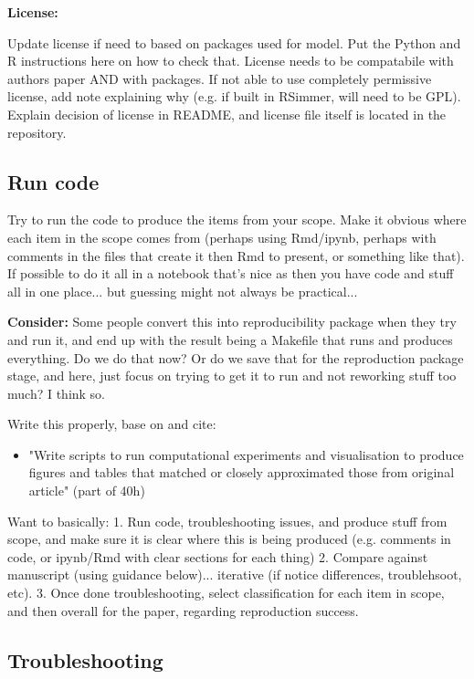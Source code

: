\textbf{License:}

Update license if need to based on packages used for model. Put the Python and R instructions here on how to check that. License needs to be compatabile with authors paper AND with packages. If not able to use completely permissive license, add note explaining why (e.g. if built in RSimmer, will need to be GPL). Explain decision of license in README, and license file itself is located in the repository.

\subsection{Run code}

Try to run the code to produce the items from your scope.
Make it obvious where each item in the scope comes from (perhaps using Rmd/ipynb, perhaps with comments in the files that create it then Rmd to present, or something like that). If possible to do it all in a notebook that's nice as then you have code and stuff all in one place... but guessing might not always be practical...

\textbf{Consider:} Some people convert this into reproducibility package when they try and run it, and end up with the result being a Makefile that runs and produces everything. Do we do that now? Or do we save that for the reproduction package stage, and here, just focus on trying to get it to run and not reworking stuff too much? I think so.

Write this properly, base on and cite:
\begin{itemize}
    \item "Write scripts to run computational experiments and visualisation to produce figures and tables that matched or closely approximated those from original article" (part of 40h)\autocite{krafczyk_learning_2021}
\end{itemize}

Want to basically:
1. Run code, troubleshooting issues, and produce stuff from scope, and make sure it is clear where this is being produced (e.g. comments in code, or ipynb/Rmd with clear sections for each thing)
2. Compare against manuscript (using guidance below)... iterative (if notice differences, troublehsoot, etc).
3. Once done troubleshooting, select classification for each item in scope, and then overall for the paper, regarding reproduction success.

\subsection{Troubleshooting}

